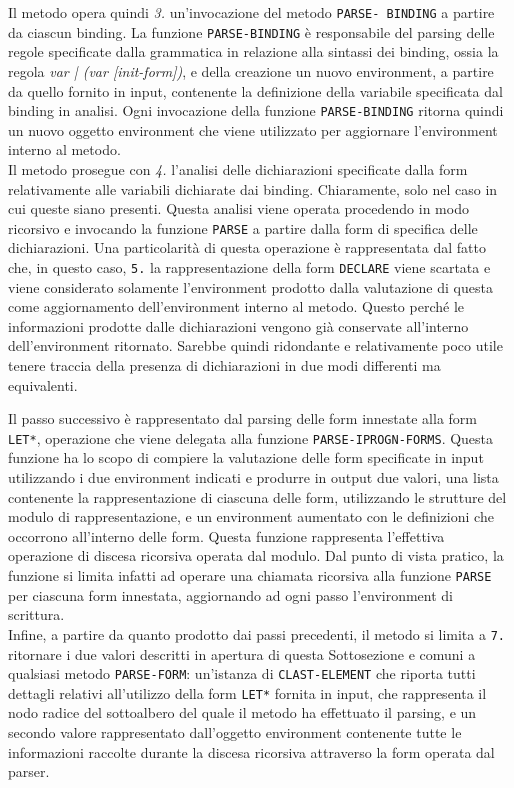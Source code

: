 Il metodo opera quindi \textit{3.} un’invocazione del metodo \texttt {PARSE-
BINDING} a partire da ciascun binding. La funzione \texttt {PARSE-BINDING} è
responsabile del parsing delle regole specificate dalla grammatica in relazione
alla sintassi dei binding, ossia la regola \textit {var | (var [init-form])}, e
della creazione un nuovo environment, a partire da quello fornito in input,
contenente la definizione della variabile specificata dal binding in analisi.
Ogni invocazione della funzione \texttt{PARSE-BINDING} ritorna quindi un nuovo
oggetto environment che viene utilizzato per aggiornare l’environment interno al
metodo.\\

Il metodo prosegue con \textit{4.} l’analisi delle dichiarazioni specificate
dalla form relativamente alle variabili dichiarate dai binding. Chiaramente,
solo nel caso in cui queste siano presenti. Questa analisi viene operata
procedendo in modo ricorsivo e invocando la funzione \texttt{PARSE} a partire
dalla form di specifica delle dichiarazioni. Una particolarità di questa
operazione è rappresentata dal fatto che, in questo caso, \texttt{5.} la
rappresentazione della form \texttt{DECLARE} viene scartata e viene considerato
solamente l'environment prodotto dalla valutazione di questa come aggiornamento
dell'environment interno al metodo. Questo perché le informazioni prodotte dalle
dichiarazioni vengono già conservate all'interno dell'environment ritornato.
Sarebbe quindi ridondante e relativamente poco utile tenere traccia della
presenza di dichiarazioni in due modi differenti ma equivalenti.

Il passo successivo è rappresentato dal parsing delle form innestate alla form
\texttt{LET*}, operazione che viene delegata alla funzione
\texttt{PARSE-IPROGN-FORMS}. Questa funzione ha lo scopo di compiere la
valutazione delle form specificate in input utilizzando i due environment
indicati e produrre in output due valori, una lista contenente la
rappresentazione di ciascuna delle form, utilizzando le strutture del modulo di
rappresentazione, e un environment aumentato con le definizioni che occorrono
all’interno delle form. Questa funzione rappresenta l'effettiva operazione di
discesa ricorsiva operata dal modulo. Dal punto di vista pratico, la funzione si
limita infatti ad operare una chiamata ricorsiva alla funzione \texttt{PARSE}
per ciascuna form innestata, aggiornando ad ogni passo l'environment di
scrittura.\\

Infine, a partire da quanto prodotto dai passi precedenti, il metodo si limita
a \texttt{7.} ritornare i due valori descritti in apertura di questa
Sottosezione e comuni a qualsiasi metodo \texttt{PARSE-FORM}: un'istanza di
\texttt{CLAST-ELEMENT} che riporta tutti dettagli relativi all'utilizzo della
form \texttt{LET*} fornita in input, che rappresenta il nodo radice del
sottoalbero del quale il metodo ha effettuato il parsing, e un secondo valore
rappresentato dall'oggetto environment contenente tutte le informazioni
raccolte durante la discesa ricorsiva attraverso la form operata dal parser.\\


